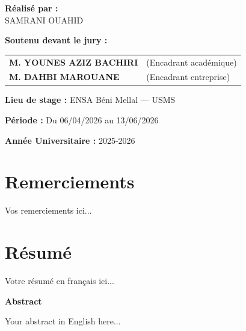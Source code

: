 \documentclass[12pt,a4paper]{report}
\begin{document}
\begin{titlepage}
    \vspace{2.5cm}
    
    {\large \textbf{Réalisé par :}\\ SAMRANI OUAHID\par}
    
    \vspace{1.5cm}
    
    {\large \textbf{Soutenu devant le jury :}\par}
    \vspace{0.5cm}
    \begin{center}
    \begin{tabular}{ll}
        \textbf{M. YOUNES AZIZ BACHIRI} & (Encadrant académique) \\
        \textbf{M. DAHBI MAROUANE} & (Encadrant entreprise) \\
    \end{tabular}
    \end{center}
    
    \vfill
    
    {\large \textbf{Lieu de stage :} ENSA Béni Mellal — USMS\par}
    \vspace{0.2cm}
    {\large \textbf{Période :} Du 06/04/2026 au 13/06/2026\par}
    \vspace{0.2cm}
    {\large \textbf{Année Universitaire :} 2025-2026\par}
    
\end{titlepage}



\chapter*{Remerciements}
Vos remerciements ici...

\chapter*{Résumé}
Votre résumé en français ici...

\vspace{1cm}
\begin{center}
    \textbf{\Large Abstract}
\end{center}
Your abstract in English here...
\end{document}
